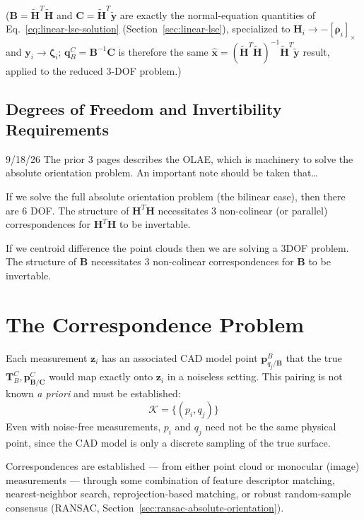 \documentclass{article}
\newcommand{\vect}[1]{\mathbf{#1}}
\newcommand{\mat}[1]{\mathbf{#1}}
\newcommand{\TCB}{\mat{T}^C_{B}}
\newcommand{\pBjB}{\vect{p}^{\mathit{B}}_{q_{j}/\mathbf{B}}}
\newcommand{\pBCC}{\vect{p}^{\mathit{C}}_{\mathbf{B}/\mathbf{C}}}
\newcommand{\Kmat}{\mat{K}} %
\newcommand{\corrSet}{\mathcal{K}} %
\newcommand{\skewop}[1]{\left[#1\right]_{\times}} %
\newcommand{\qCB}{\vect{q}^{C}_{B}} %
\newcommand{\zetaVec}{\vect{\zeta}} %
\newcommand{\rhoVec}{\vect{\rho}} %
\begin{document}
\noindent ($\mat{B} = \tilde{\mat{H}}^T\tilde{\mat{H}}$ and $\vect{C} = \tilde{\mat{H}}^T\tilde{\vect{y}}$ are exactly the normal-equation quantities of Eq.~\eqref{eq:linear-lse-solution} (Section~\ref{sec:linear-lse}), specialized to $\mat{H}_i \to -\skewop{\rhoVec_i}$ and $\vect{y}_i \to \zetaVec_i$; $\qCB = \mat{B}^{-1}\vect{C}$ is therefore the same $\hat{\vect{x}} = (\tilde{\mat{H}}^T\tilde{\mat{H}})^{-1}\tilde{\mat{H}}^T\tilde{\vect{y}}$ result, applied to the reduced 3-DOF problem.)

\subsection{Degrees of Freedom and Invertibility Requirements}

\begin{authornotes}{9/18/26}
The prior 3 pages describes the OLAE, which is machinery to solve the absolute orientation problem. An important note should be taken that\dots

If we solve the full absolute orientation problem (the bilinear case), then there are 6 DOF. The structure of $\mat{H}^T \mat{H}$ necessitates 3 non-colinear (or parallel) correspondences for $\mat{H}^T \mat{H}$ to be invertable.

If we centroid difference the point clouds then we are solving a 3DOF problem. The structure of $\mat{B}$ necessitates 3 non-colinear correspondences for $\mat{B}$ to be invertable.
\end{authornotes}

\newpage
\section{The Correspondence Problem}
\label{sec:correspondence-problem}

Each measurement $\vect{z}_i$ has an associated CAD model point $\pBjB$ that the true $\TCB, \pBCC$ would map exactly onto $\vect{z}_i$ in a noiseless setting. This pairing is not known \emph{a priori} and must be established:
\begin{equation}
\corrSet = \{ (p_{i},q_{j}) \}
\end{equation}
Even with noise-free measurements, $p_{i}$ and $q_{j}$ need not be the same physical point, since the CAD model is only a discrete sampling of the true surface.

Correspondences are established --- from either point cloud or monocular (image) measurements --- through some combination of feature descriptor matching, nearest-neighbor search, reprojection-based matching, or robust random-sample consensus (RANSAC, Section~\ref{sec:ransac-absolute-orientation}).
\end{document}
